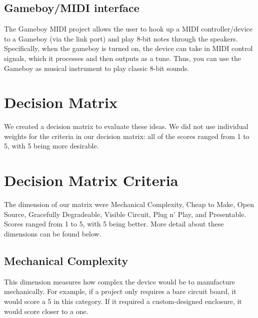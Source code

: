 \documentclass{article}
\begin{document}
\subsection{Gameboy/MIDI interface}

The Gameboy MIDI project allows the user to hook up a MIDI
controller/device to a Gameboy (via the link port) and play 8-bit
notes through the speakers. Specifically, when the gameboy is turned
on, the device can take in MIDI control signals, which it processes
and then outputs as a tune. Thus, you can use the Gameboy as musical
instrument to play classic 8-bit sounds.

\section{Decision Matrix}
We created a decision matrix to evaluate these ideas. We did not use
individual weights for the criteria in our decision matrix: all of the
scores ranged from 1 to 5, with 5 being more desirable.


\section{Decision Matrix Criteria}
The dimension of
our matrix were Mechanical Complexity, Cheap to Make, Open Source,
Gracefully Degradeable, Visible Circuit, Plug n' Play, and
Presentable. Scores ranged from 1 to 5, with 5 being better. More
detail about these dimensions can be found below.
\subsection {Mechanical Complexity}
This dimension measures how complex the device would be to manufacture
mechanically. For example, if a project only requires a bare circuit
board, it would score a 5 in this category. If it required a
custom-designed enclosure, it would score closer to a one. 
\end{document}
